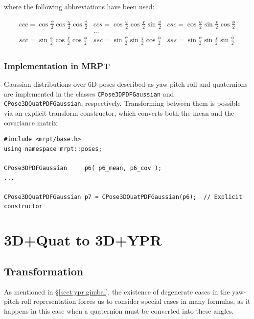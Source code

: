 \documentclass[a4paper,10pt]{report}
\begin{document}
\noindent where the following abbreviations have been used:

\begin{equation*}
\begin{array}{ccc}
ccc = \cos\frac{\psi}{2}\cos\frac{\chi}{2}\cos\frac{\phi}{2}  & 
ccs = \cos\frac{\psi}{2}\cos\frac{\chi}{2}\sin\frac{\phi}{2}  & 
csc = \cos\frac{\psi}{2}\sin\frac{\chi}{2}\cos\frac{\phi}{2}  \\
 & ... & \\
scc = \sin\frac{\psi}{2}\cos\frac{\chi}{2}\cos\frac{\phi}{2}  & 
ssc = \sin\frac{\psi}{2}\sin\frac{\chi}{2}\cos\frac{\phi}{2}  & 
sss = \sin\frac{\psi}{2}\sin\frac{\chi}{2}\sin\frac{\phi}{2}  \\
\end{array}
\end{equation*}



\subsubsection{Implementation in MRPT}

Gaussian distributions over 6D poses described as yaw-pitch-roll and quaternions 
are implemented in the classes \texttt{CPose3DPDFGaussian} and \texttt{CPose3DQuatPDFGaussian}, respectively.
Transforming between them is possible via an explicit transform constructor, which 
converts both the mean and the covariance matrix:

\begin{lstlisting}
#include <mrpt/base.h> 
using namespace mrpt::poses; 

CPose3DPDFGaussian     p6( p6_mean, p6_cov ); 
...

CPose3DQuatPDFGaussian p7 = CPose3DQuatPDFGaussian(p6);  // Explicit constructor
\end{lstlisting}


\section{3D+Quat to 3D+YPR  }

\subsection{Transformation}

As mentioned in \S \ref{sect:ypr:gimbal}, the existence of degenerate cases in 
the yaw-pitch-roll representation forces us to consider special cases in many formulas, 
as it happens in this case when a quaternion must be converted into these angles.
\end{document}
